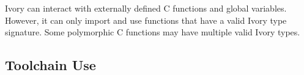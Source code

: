 Ivory can interact with externally defined C functions and global
variables. However, it can only import and use functions that have a
valid Ivory type signature. Some polymorphic C functions may have multiple
valid Ivory types.

\subsection{Toolchain Use}

